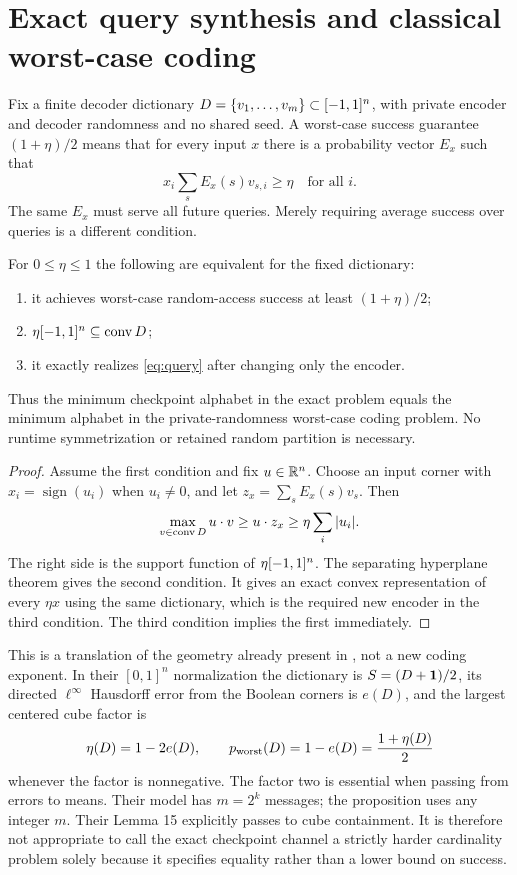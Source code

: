 \section{Exact query synthesis and classical worst-case coding}
\label{sec:rac}
Fix a finite decoder dictionary $D=\{v_1,\ldots,v_m\}\subset[-1,1]^n$,
with private encoder and decoder randomness and no shared seed. A
worst-case success guarantee $(1+\eta)/2$ means that for every input
$x$ there is a probability vector $E_x$ such that
\[
        x_i\sum_s E_x(s)v_{s,i}\ge\eta\quad\text{for all }i.
\]
The same $E_x$ must serve all future queries. Merely requiring average
success over queries is a different condition.

\begin{proposition}
\label{prop:exactification}
For $0\le\eta\le1$ the following are equivalent for the fixed dictionary:
\begin{enumerate}
\item it achieves worst-case random-access success at least $(1+\eta)/2$;
\item $\eta[-1,1]^n\subseteq\operatorname{conv} D$;
\item it exactly realizes \eqref{eq:query} after changing only the encoder.
\end{enumerate}
Thus the minimum checkpoint alphabet in the exact problem equals the
minimum alphabet in the private-randomness worst-case coding problem.
No runtime symmetrization or retained random partition is necessary.
\end{proposition}
\begin{proof}
Assume the first condition and fix $u\in\mathbb R^n$. Choose an input corner
with $x_i=\operatorname{sign}(u_i)$ when $u_i\ne0$, and let
$z_x=\sum_sE_x(s)v_s$. Then
\[
          \max_{v\in\operatorname{conv} D}u\cdot v\ge u\cdot z_x
                  \ge\eta\sum_i|u_i|.
\]
The right side is the support function of $\eta[-1,1]^n$. The separating
hyperplane theorem gives the second condition. It gives an exact convex
representation of every $\eta x$ using the same dictionary, which is
the required new encoder in the third condition. The third condition
implies the first immediately.
\end{proof}

This is a translation of the geometry already present in
\cite[Theorem 14, Lemma 15 and equations (143)--(149)]{Kondo2026}, not
a new coding exponent. In their $[0,1]^n$ normalization the dictionary
is $S=(D+\mathbf1)/2$, its directed $\ell^\infty$ Hausdorff error from the
Boolean corners is $e(D)$, and the largest centered cube factor is
\[
             \eta(D)=1-2e(D),\qquad
             p_{\rm worst}(D)=1-e(D)=\frac{1+\eta(D)}2
\]
whenever the factor is nonnegative. The factor two is essential when
passing from errors to means. Their model has $m=2^k$ messages; the
proposition uses any integer $m$. Their Lemma 15 explicitly passes to
cube containment. It is therefore not appropriate to call the exact
checkpoint channel a strictly harder cardinality problem solely because
it specifies equality rather than a lower bound on success.


